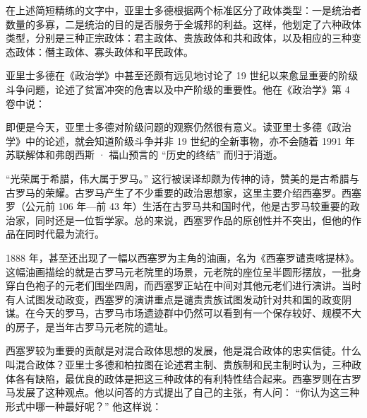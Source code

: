 在上述简短精练的文字中，亚里士多德根据两个标准区分了政体类型：一是统治者数量的多寡，二是统治的目的是否服务于全城邦的利益。这样，他划定了六种政体类型，分别是三种正宗政体：君主政体、贵族政体和共和政体，以及相应的三种变态政体：僭主政体、寡头政体和平民政体。

亚里士多德在《政治学》中甚至还颇有远见地讨论了 19 世纪以来愈显重要的阶级斗争问题，论述了贫富冲突的危害以及中产阶级的重要性。他在《政治学》第 4 卷中说：


即便是今天，亚里士多德对阶级问题的观察仍然很有意义。读亚里士多德《政治学》中的论述，就会知道阶级斗争并非 19 世纪的全新事物，亦不会随着 1991 年苏联解体和弗朗西斯 · 福山预言的 “历史的终结” 而归于消逝。

 “光荣属于希腊，伟大属于罗马。” 这行被误译却颇为传神的诗，赞美的是古希腊与古罗马的荣耀。古罗马产生了不少重要的政治思想家，这里主要介绍西塞罗。西塞罗（公元前 106 年—前 43 年）生活在古罗马共和国时代，他是古罗马较重要的政治家，同时还是一位哲学家。总的来说，西塞罗作品的原创性并不突出，但他的作品在同时代最为流行。

1888 年，甚至还出现了一幅以西塞罗为主角的油画，名为《西塞罗谴责喀提林》。这幅油画描绘的就是古罗马元老院里的场景，元老院的座位呈半圆形摆放，一批身穿白色袍子的元老们围坐四周，而西塞罗正站在中间对其他元老们进行演讲。当时有人试图发动政变，西塞罗的演讲重点是谴责贵族试图发动针对共和国的政变阴谋。在今天的罗马，古罗马市场遗迹群中仍然可以看到有一个保存较好、规模不大的房子，是当年古罗马元老院的遗址。

西塞罗较为重要的贡献是对混合政体思想的发展，他是混合政体的忠实信徒。什么叫混合政体？亚里士多德和柏拉图在论述君主制、贵族制和民主制时认为，三种政体各有缺陷，最优良的政体是把这三种政体的有利特性结合起来。西塞罗则在古罗马发展了这种观点。他以问答的方式提出了自己的主张，有人问： “你认为这三种形式中哪一种最好呢？” 他这样说：


